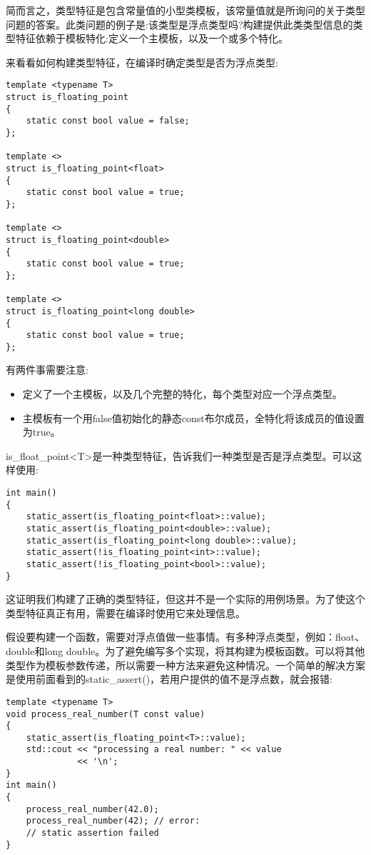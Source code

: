简而言之，类型特征是包含常量值的小型类模板，该常量值就是所询问的关于类型问题的答案。此类问题的例子是:该类型是浮点类型吗?构建提供此类类型信息的类型特征依赖于模板特化:定义一个主模板，以及一个或多个特化。

来看看如何构建类型特征，在编译时确定类型是否为浮点类型:

\begin{lstlisting}[style=styleCXX]
template <typename T>
struct is_floating_point
{
	static const bool value = false;
};

template <>
struct is_floating_point<float>
{
	static const bool value = true;
};

template <>
struct is_floating_point<double>
{
	static const bool value = true;
};

template <>
struct is_floating_point<long double>
{
	static const bool value = true;
};
\end{lstlisting}

有两件事需要注意:

\begin{itemize}
\item
定义了一个主模板，以及几个完整的特化，每个类型对应一个浮点类型。

\item
主模板有一个用false值初始化的静态const布尔成员，全特化将该成员的值设置为true。
\end{itemize}

is\_float\_point<T>是一种类型特征，告诉我们一种类型是否是浮点类型。可以这样使用:

\begin{lstlisting}[style=styleCXX]
int main()
{
	static_assert(is_floating_point<float>::value);
	static_assert(is_floating_point<double>::value);
	static_assert(is_floating_point<long double>::value);
	static_assert(!is_floating_point<int>::value);
	static_assert(!is_floating_point<bool>::value);
}
\end{lstlisting}

这证明我们构建了正确的类型特征，但这并不是一个实际的用例场景。为了使这个类型特征真正有用，需要在编译时使用它来处理信息。

假设要构建一个函数，需要对浮点值做一些事情。有多种浮点类型，例如：float、double和long double。为了避免编写多个实现，将其构建为模板函数。可以将其他类型作为模板参数传递，所以需要一种方法来避免这种情况。一个简单的解决方案是使用前面看到的static\_assert()，若用户提供的值不是浮点数，就会报错:

\begin{lstlisting}[style=styleCXX]
template <typename T>
void process_real_number(T const value)
{
	static_assert(is_floating_point<T>::value);
	std::cout << "processing a real number: " << value
			  << '\n';
}
int main()
{
	process_real_number(42.0);
	process_real_number(42); // error:
	// static assertion failed
}
\end{lstlisting}

